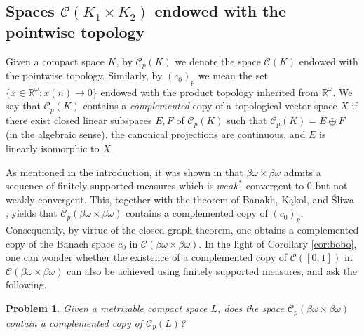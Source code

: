 \documentclass[12pt,fleqn]{amsart}
\numberwithin{equation}{section}
\newtheorem{prob}[thm]{Problem}
\theoremstyle{definition}
\def\C{\mathcal C}
\def\er{\mathbb R}
\newcommand{\bobo}{\beta\omega\times\beta\omega}
\begin{document}





\subsection{Spaces $\C(K_1\times K_2)$ endowed with the pointwise topology\label{sec_pt}}

Given a compact space $K$, by $\C_p(K)$ we denote the space $\C(K)$ endowed with the pointwise topology. Similarly, by $(c_0)_p$ we mean the set $\{x\in\er^\omega\colon x(n)\to0\}$ endowed with the product topology inherited from $\mathbb{R}^\omega$. We say that $\C_p(K)$ contains a \emph{complemented} copy of a topological vector space $X$ if there exist closed linear subspaces $E,F$ of $\C_p(K)$ such that $\C_p(K)=E\oplus F$ (in the algebraic sense), the canonical projections are continuous, and $E$ is linearly isomorphic to $X$. 

As mentioned in the introduction, it was shown in \cite{KSZ} that $\bobo$ admits a sequence of finitely supported measures which is $weak^\ast$ convergent to $0$ but not weakly convergent. This, together with the theorem of Banakh, K\k{a}kol, and \'{S}liwa \cite{BKS}, yields that $\C_p(\bobo)$ contains a complemented copy of $(c_0)_p$. Consequently, by virtue of the closed graph theorem, one obtains a complemented copy of the Banach space $c_0$ in $\C(\bobo)$. In the light of Corollary \ref{cor:bobo}, one can wonder whether the existence of a complemented copy of $\C([0,1])$ in $\C(\bobo)$ can also be achieved using finitely supported measures, and ask the following.


\begin{prob}\label{cp}
  Given a  metrizable compact space $L$, does the space $\C_p(\bobo)$ contain a complemented copy of $\C_p(L)$? 
\end{prob}
\end{document}
